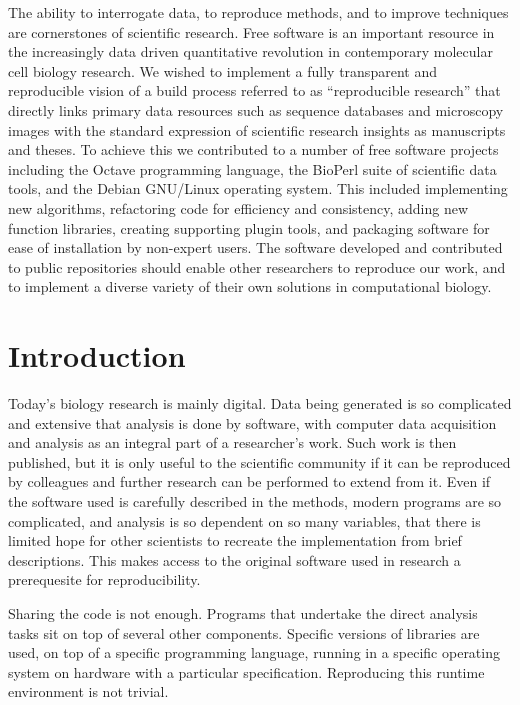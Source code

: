 \begin{chapterabstract}
  The ability to interrogate data, to reproduce methods, and to
  improve techniques are cornerstones of scientific research.  Free
  software is an important resource in the increasingly data driven
  quantitative revolution in contemporary molecular cell biology
  research.  We wished to implement a fully transparent and
  reproducible vision of a build process referred to as ``reproducible
  research'' that directly links primary data resources such as
  sequence databases and microscopy images with the standard
  expression of scientific research insights as manuscripts and
  theses.  To achieve this we contributed to a number of free software
  projects including the Octave programming language, the BioPerl
  suite of scientific data tools, and the Debian GNU/Linux operating
  system.  This included implementing new algorithms, refactoring code
  for efficiency and consistency, adding new function libraries,
  creating supporting plugin tools, and packaging software for ease of
  installation by non-expert users.  The software developed and
  contributed to public repositories should enable other researchers
  to reproduce our work, and to implement a diverse variety of their
  own solutions in computational biology.
\end{chapterabstract}

\section{Introduction}

Today's biology research is mainly digital.  Data being generated is so
complicated and extensive that analysis is done by software, with computer data
acquisition and analysis as an integral part of a researcher's work.
Such work is then published, but it is only useful to the scientific
community if it can be reproduced by colleagues and further
research can be performed to extend from it.  Even if the software used is
carefully described in the methods, modern programs are so
complicated, and analysis is so dependent on so many variables, that
there is limited hope for other scientists to recreate the
implementation from brief descriptions.  This
makes access to the original software used in research a prerequesite for
reproducibility.

Sharing the code is not enough.  Programs that undertake the direct analysis
tasks sit on top of several other components.  Specific versions of
libraries are used, on top of a specific programming language, running
in a specific operating system on hardware with a particular
specification.  Reproducing this runtime environment is not trivial.

